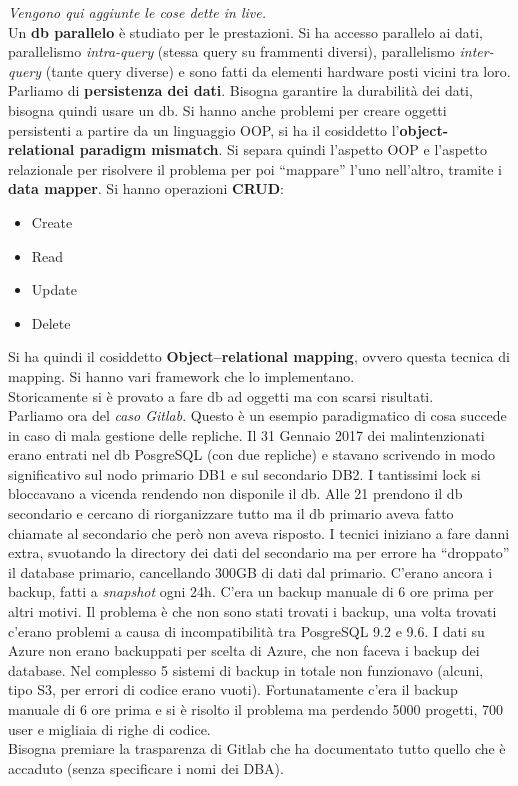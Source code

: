 \documentclass[a4paper,12pt, oneside]{book}
\begin{document}
\begin{shaded}
  \noindent
  \textit{Vengono qui aggiunte le cose dette in live.}\\
  Un \textbf{db parallelo} è studiato per le prestazioni. Si ha accesso
  parallelo ai dati, parallelismo \textit{intra-query} (stessa query su
  frammenti diversi), parallelismo \textit{inter-query} (tante query diverse) e
  sono fatti da elementi hardware posti vicini tra loro.\\
  Parliamo di \textbf{persistenza dei dati}. Bisogna garantire la durabilità dei
  dati, bisogna quindi usare un db. Si hanno anche problemi per creare oggetti
  persistenti a partire da un linguaggio OOP, si ha il cosiddetto
  l'\textbf{object-relational paradigm mismatch}. Si separa quindi l'aspetto OOP
  e l'aspetto relazionale per risolvere il problema per poi ``mappare'' l'uno
  nell'altro, tramite i \textbf{data mapper}. Si hanno operazioni \textbf{CRUD}:
  \begin{itemize}
    \item Create
    \item Read
    \item Update
    \item Delete
  \end{itemize}
  Si ha quindi il cosiddetto \textbf{Object–relational mapping}, ovvero questa
  tecnica di mapping. Si hanno vari framework che lo implementano.\\
  Storicamente si è provato a fare db ad oggetti ma con scarsi risultati.\\
  Parliamo ora del \textit{caso Gitlab}. Questo è un esempio paradigmatico di
  cosa succede in caso di mala gestione delle repliche. Il 31 Gennaio 2017 dei
  malintenzionati erano entrati nel db PosgreSQL (con due repliche) e stavano
  scrivendo in modo significativo sul nodo primario DB1 e sul secondario DB2. I
  tantissimi lock si bloccavano a vicenda rendendo non disponile il db. Alle 21
  prendono il db secondario e cercano di riorganizzare tutto ma il db primario
  aveva fatto chiamate al secondario che però non aveva risposto. I tecnici
  iniziano a fare danni extra, svuotando la directory dei dati del secondario ma
  per errore ha ``droppato'' il database primario, cancellando 300GB di dati dal
  primario. C'erano ancora i backup, fatti a \textit{snapshot} ogni 24h. C'era
  un backup manuale di 6 ore prima per altri motivi. Il problema è che non sono
  stati trovati i backup, una volta trovati c'erano problemi a causa di
  incompatibilità tra PosgreSQL 9.2 e 9.6. I dati su Azure non erano
  backuppati per scelta di Azure, che non faceva i backup dei database. Nel
  complesso 5 sistemi di backup in totale non funzionavo (alcuni, tipo S3, per 
  errori di codice erano vuoti). Fortunatamente c'era il backup manuale di 6 ore
  prima e si è risolto il problema ma perdendo 5000 progetti, 700 user e
  migliaia di righe di codice.\\ 
  Bisogna premiare la trasparenza di Gitlab che ha documentato tutto quello che
  è accaduto (senza specificare i nomi dei DBA).
\end{shaded}
\end{document}
